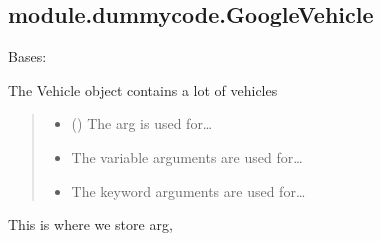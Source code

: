 \documentclass[letterpaper,10pt,english]{sphinxmanual}
\begin{document}
\sphinxstepscope


\subsection{module.dummycode.GoogleVehicle}
\label{\detokenize{_autosummary/module.dummycode.GoogleVehicle:module-dummycode-googlevehicle}}\label{\detokenize{_autosummary/module.dummycode.GoogleVehicle::doc}}

\begin{fulllineitems}
\label{\detokenize{_autosummary/module.dummycode.GoogleVehicle:module.dummycode.GoogleVehicle}}
\pysigstartsignatures
{}
\pysigstopsignatures
\sphinxAtStartPar
Bases: 

\sphinxAtStartPar
The Vehicle object contains a lot of vehicles
\begin{quote}\begin{description}
\begin{itemize}
\item {} 
\sphinxAtStartPar
{} () \textendash{} The arg is used for…

\item {} 
\sphinxAtStartPar
{} \textendash{} The variable arguments are used for…

\item {} 
\sphinxAtStartPar
{} \textendash{} The keyword arguments are used for…

\end{itemize}

\end{description}\end{quote}

\begin{fulllineitems}
\label{\detokenize{_autosummary/module.dummycode.GoogleVehicle:module.dummycode.GoogleVehicle.arg}}
\pysigstartsignatures
{}
\pysigstopsignatures
\sphinxAtStartPar
This is where we store arg,
\begin{quote}\begin{description}
\sphinxAtStartPar
{}


\end{description}
\end{quote}
\end{fulllineitems}
\end{fulllineitems}
\end{document}
